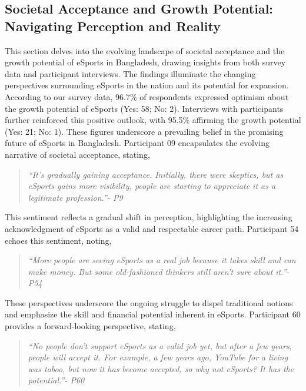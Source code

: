 \documentclass[manuscript,screen,review,anonymous]{acmart}
\begin{document}
\subsection{Societal Acceptance and Growth Potential: Navigating Perception and Reality}

This section delves into the evolving landscape of societal acceptance and the growth potential of eSports in Bangladesh, drawing insights from both survey data and participant interviews. The findings illuminate the changing perspectives surrounding eSports in the nation and its potential for expansion. According to our survey data, 96.7\% of respondents expressed optimism about the growth potential of eSports (Yes: 58; No: 2). Interviews with participants further reinforced this positive outlook, with 95.5\% affirming the growth potential (Yes: 21; No: 1). These figures underscore a prevailing belief in the promising future of eSports in Bangladesh. Participant 09 encapsulates the evolving narrative of societal acceptance, stating,

\begin{quote}
{\emph{``It's gradually gaining acceptance. Initially, there were skeptics, but as eSports gains more visibility, people are starting to appreciate it as a legitimate profession.''- P9}}
\end{quote}

This sentiment reflects a gradual shift in perception, highlighting the increasing acknowledgment of eSports as a valid and respectable career path. Participant 54 echoes this sentiment, noting,

\begin{quote}
{\emph{``More people are seeing eSports as a real job because it takes skill and can make money. But some old-fashioned thinkers still aren't sure about it.''- P54}}
\end{quote}

These perspectives underscore the ongoing struggle to dispel traditional notions and emphasize the skill and financial potential inherent in eSports. Participant 60 provides a forward-looking perspective, stating,

\begin{quote}
{\emph{``No people don't support eSports as a valid job yet, but after a few years, people will accept it. For example, a few years ago, YouTube for a living was taboo, but now it has become accepted, so why not eSports? It has the potential.''- P60}}
\end{quote}
\end{document}

